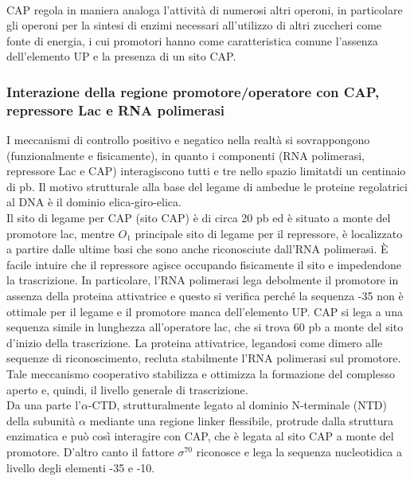 \documentclass{article}
\begin{document}
\paragraph{}
CAP regola in maniera analoga l'attività di numerosi altri operoni, in particolare gli operoni per la sintesi di enzimi necessari all'utilizzo di altri zuccheri come
fonte di energia, i cui promotori hanno come caratteristica comune l'assenza dell'elemento UP e la presenza di un sito CAP.
\subsubsection{Interazione della regione promotore/operatore con CAP,
repressore Lac e RNA polimerasi}
I meccanismi di controllo positivo e negatico nella realtà si sovrappongono (funzionalmente e fisicamente), in quanto i componenti (RNA polimerasi, repressore Lac e CAP) 
interagiscono tutti e tre nello spazio limitatdi un centinaio di pb. Il motivo strutturale alla base del legame di ambedue le proteine regolatrici al DNA è
il dominio elica-giro-elica.\\
Il sito di legame per CAP (sito CAP) è di circa 20 pb ed è situato a monte del promotore lac, mentre $O_{1}$
principale sito di legame per il repressore, è localizzato a partire dalle ultime
basi che sono anche riconosciute dall'RNA polimerasi. È facile intuire che il
repressore agisce occupando fisicamente il sito e impedendone la trascrizione.
In particolare, l'RNA polimerasi lega debolmente il promotore in assenza della
proteina attivatrice e questo si verifica perché la sequenza -35 non
è ottimale per il legame e il promotore manca dell'elemento UP. CAP si lega a
una sequenza simile in lunghezza all'operatore lac, che si trova 60 pb a monte
del sito d'inizio della trascrizione. La proteina attivatrice, legandosi come
dimero alle sequenze di riconoscimento, recluta stabilmente l'RNA polimerasi sul
promotore. Tale meccanismo cooperativo stabilizza e ottimizza la formazione
del complesso aperto e, quindi, il livello generale di trascrizione.\\
Da una parte l'$\alpha$-CTD, strutturalmente legato al dominio N-terminale (NTD)
della subunità $\alpha$ mediante una regione linker flessibile, protrude dalla struttura
enzimatica e può così interagire con CAP, che è legata al sito CAP a monte del
promotore. D'altro canto il fattore $\sigma^{70}$ riconosce e lega la sequenza nucleotidica
a livello degli elementi -35 e -10.\\
\end{document}
